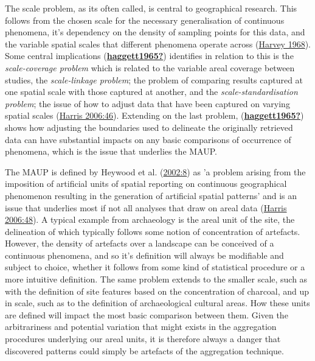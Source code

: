 \documentclass[
  a4paper,
  oneside]{uiophdthesis}
\begin{document}
The scale problem, as its often called, is central to geographical research. This follows from the chosen scale for the necessary generalisation of continuous phenomena, it's dependency on the density of sampling points for this data, and the variable spatial scales that different phenomena operate across (\protect\hyperlink{ref-harvey1968}{Harvey 1968}). Some central implications (\protect\hyperlink{ref-haggett1965}{\textbf{haggett1965?}}) identifies in relation to this is the \emph{scale-coverage problem} which is related to the variable areal coverage between studies, the \emph{scale-linkage problem}; the problem of comparing results captured at one spatial scale with those captured at another, and the \emph{scale-standardisation problem}; the issue of how to adjust data that have been captured on varying spatial scales (\protect\hyperlink{ref-harris2006}{Harris 2006:46}). Extending on the last problem, (\protect\hyperlink{ref-haggett1965}{\textbf{haggett1965?}}) shows how adjusting the boundaries used to delineate the originally retrieved data can have substantial impacts on any basic comparisons of occurrence of phenomena, which is the issue that underlies the MAUP.

The MAUP is defined by Heywood et al. (\protect\hyperlink{ref-heywood2002}{2002:8}) as 'a problem arising from the imposition of artificial units of spatial reporting on continuous geographical phenomenon resulting in the generation of artificial spatial patterns' and is an issue that underlies most if not all analyses that draw on areal data (\protect\hyperlink{ref-harris2006}{Harris 2006:48}). A typical example from archaeology is the areal unit of the site, the delineation of which typically follows some notion of concentration of artefacts. However, the density of artefacts over a landscape can be conceived of a continuous phenomena, and so it's definition will always be modifiable and subject to choice, whether it follows from some kind of statistical procedure or a more intuitive definition. The same problem extends to the smaller scale, such as with the definition of site features based on the concentration of charcoal, and up in scale, such as to the definition of archaeological cultural areas. How these units are defined will impact the most basic comparison between them. Given the arbitrariness and potential variation that might exists in the aggregation procedures underlying our areal units, it is therefore always a danger that discovered patterns could simply be artefacts of the aggregation technique.
\end{document}
